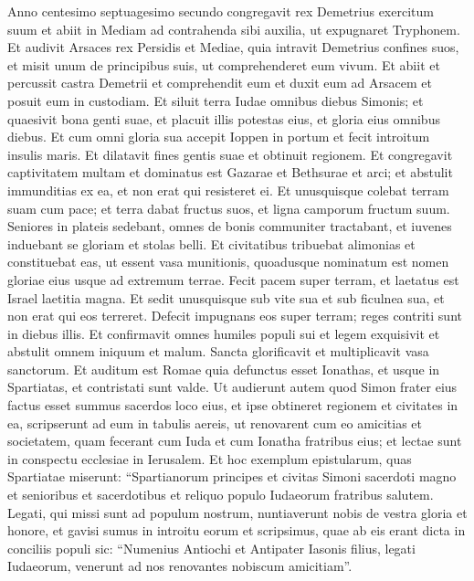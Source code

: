\begin{biblechapter}  
\verse Anno centesimo septuagesimo secundo congregavit rex Demetrius exercitum suum et abiit in Mediam ad contrahenda sibi auxilia, ut expugnaret Tryphonem.  
\verse Et audivit Arsaces rex Persidis et Mediae, quia intravit Demetrius confines suos, et misit unum de principibus suis, ut comprehenderet eum vivum. 
\verse Et abiit et percussit castra Demetrii et comprehendit eum et duxit eum ad Arsacem et posuit eum in custodiam. 
\verse Et siluit terra Iudae omnibus diebus Simonis; et quaesivit bona genti suae, et placuit illis potestas eius, et gloria eius omnibus diebus. 
\verse Et cum omni gloria sua accepit Ioppen in portum et fecit introitum insulis maris. 
\verse Et dilatavit fines gentis suae et obtinuit regionem. 
\verse Et congregavit captivitatem multam et dominatus est Gazarae et Bethsurae et arci; et abstulit immunditias ex ea, et non erat qui resisteret ei. 
\verse Et unusquisque colebat terram suam cum pace; et terra dabat fructus suos, et ligna camporum fructum suum. 
\verse Seniores in plateis sedebant, omnes de bonis communiter tractabant, et iuvenes induebant se gloriam et stolas belli. 
\verse Et civitatibus tribuebat alimonias et constituebat eas, ut essent vasa munitionis, quoadusque nominatum est nomen gloriae eius usque ad extremum terrae. 
\verse Fecit pacem super terram, et laetatus est Israel laetitia magna. 
\verse Et sedit unusquisque sub vite sua et sub ficulnea sua, et non erat qui eos terreret. 
\verse Defecit impugnans eos super terram; reges contriti sunt in diebus illis. 
\verse Et confirmavit omnes humiles populi sui et legem exquisivit et abstulit omnem iniquum et malum. 
\verse Sancta glorificavit et multiplicavit vasa sanctorum. 
\verse Et auditum est Romae quia defunctus esset Ionathas, et usque in Spartiatas, et contristati sunt valde. 
\verse Ut audierunt autem quod Simon frater eius factus esset summus sacerdos loco eius, et ipse obtineret regionem et civitates in ea, 
\verse scripserunt ad eum in tabulis aereis, ut renovarent cum eo amicitias et societatem, quam fecerant cum Iuda et cum Ionatha fratribus eius; 
\verse et lectae sunt in conspectu ecclesiae in Ierusalem. Et hoc exemplum epistularum, quas Spartiatae miserunt: 
\verse “Spartianorum principes et civitas Simoni sacerdoti magno et senioribus et sacerdotibus et reliquo populo Iudaeorum fratribus salutem. 
\verse Legati, qui missi sunt ad populum nostrum, nuntiaverunt nobis de vestra gloria et honore, et gavisi sumus in introitu eorum  
\verse et scripsimus, quae ab eis erant dicta in conciliis populi sic: “Numenius Antiochi et Antipater Iasonis filius, legati Iudaeorum, venerunt ad nos renovantes nobiscum amicitiam”. 

\end{biblechapter}
